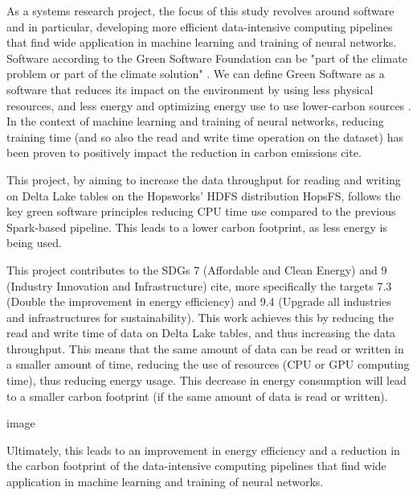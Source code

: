 As a systems research project, the focus of this study revolves around software and in particular, developing more efficient data-intensive computing pipelines that find wide application in machine learning and training of neural networks. Software according to the Green Software Foundation \cite{GreenSoftwareFoundation} can be "part of the climate problem or part of the climate solution" \cite{WhatGreenSoftware2021}. We can define Green Software as a software that reduces its impact on the environment by using less physical resources, and less energy and optimizing energy use to use lower-carbon sources \cite{WhatGreenSoftware2021}. In the context of machine learning and training of neural networks, reducing training time (and so also the read and write time operation on the dataset) has been proven to positively impact the reduction in carbon emissions cite.

This project, by aiming to increase the data throughput for reading and writing on Delta Lake tables on the Hopsworks' \gls{HDFS} distribution HopsFS, follows the key green software principles reducing CPU time use compared to the previous Spark-based pipeline. This leads to a lower carbon footprint, as less energy is being used.

This project contributes to the \glspl{SDG} 7 (Affordable and Clean Energy) and 9 (Industry Innovation and Infrastructure) cite, more specifically the targets 7.3 (Double the improvement in energy efficiency) and 9.4 (Upgrade all industries and infrastructures for sustainability). This work achieves this by reducing the read and write time of data on Delta Lake tables, and thus increasing the data throughput. This means that the same amount of data can be read or written in a smaller amount of time, reducing the use of resources (CPU or GPU computing time), thus reducing energy usage. This decrease in energy consumption will lead to a smaller carbon footprint (if the same amount of data is read or written). 

image

Ultimately, this leads to an improvement in energy efficiency and a reduction in the carbon footprint of the data-intensive computing pipelines that find wide application in machine learning and training of neural networks.

